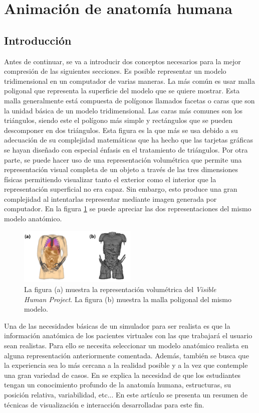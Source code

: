 \section{Animación de anatomía humana} 
\label{anatomy}

\subsection{Introducción}
Antes de continuar, se va a introducir dos conceptos necesarios para la mejor compresión de las siguientes secciones. 
Es posible representar un modelo tridimensional en un computador de varias maneras. La más común es usar malla poligonal que representa la superficie del modelo que se quiere mostrar. Esta malla generalmente está compuesta de polígonos llamados facetas o caras que son la unidad básica de un modelo tridimensional. Las caras más comunes son los triángulos, siendo este el polígono más simple y rectángulos que se pueden descomponer en dos triángulos. Esta figura es la que más se usa debido a su adecuación de su complejidad matemáticas que ha hecho que las tarjetas gráficas se hayan diseñado con especial énfasis en el tratamiento de triángulos.
Por otra parte, se puede hacer uso de una representación volumétrica que  permite una representación visual completa de un objeto a través de las tres dimensiones físicas permitiendo visualizar tanto el exterior como el interior que la representación superficial no era capaz. Sin embargo, esto produce una gran complejidad al intentarlas representar mediante imagen generada por computador.
En la figura \ref{fig:HVP} se puede apreciar las dos representaciones del mismo modelo anatómico.

\begin{figure}[h]
   \centering
    \includegraphics[width=0.5\textwidth]{IMG/volvsb-rep.png}
    \caption{La figura (a) muestra la representación volumétrica del \emph{Visible Human Project}\cite{ackerman1998visible}. La figura (b) muestra la malla poligonal del mismo modelo. }
   \label{fig:HVP}
\end{figure}
Una de las necesidades básicas de un simulador para ser realista es que la información anatómica de los pacientes virtuales con las que trabajará el usuario sean realistas. Para ello se necesita seleccionar un modelo anatómico realista en alguna representación anteriormente comentada. Además, también se busca que la experiencia sea lo más cercana a la realidad posible y a la vez que contemple una gran variedad de casos. En  \cite{preim2018survey} se explica la necesidad de que los estudiantes tengan un conocimiento profundo de la anatomía humana, estructuras, su posición relativa, variabilidad, etc... En este artículo se presenta un resumen de técnicas de visualización e interacción desarrolladas para este fin.

